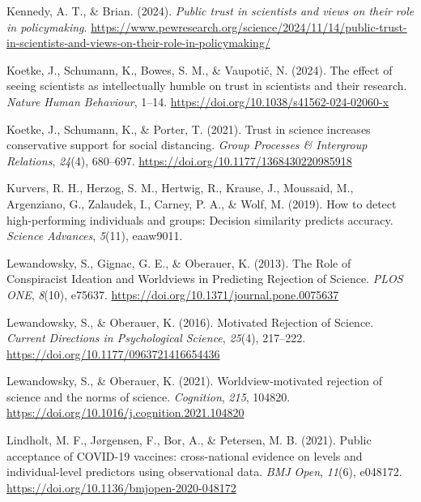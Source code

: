 \documentclass[
  jou,
  floatsintext,
  longtable,
  nolmodern,
  notxfonts,
  notimes,
  colorlinks=true,linkcolor=blue,citecolor=blue,urlcolor=blue]{apa7}
\newlength{\cslhangindent}
\newenvironment{CSLReferences}[2] %
 {\begin{list}{}{%
  \setlength{\itemindent}{0pt}
  \setlength{\leftmargin}{0pt}
  \setlength{\parsep}{0pt}
  \ifodd #1
   \setlength{\leftmargin}{\cslhangindent}
   \setlength{\itemindent}{-1\cslhangindent}
  \fi
  \setlength{\itemsep}{#2\baselineskip}}}
 {\end{list}}
\begin{document}
\begin{CSLReferences}{1}{0}
Kennedy, A. T., \& Brian. (2024). \emph{Public trust in scientists and
views on their role in policymaking}.
\url{https://www.pewresearch.org/science/2024/11/14/public-trust-in-scientists-and-views-on-their-role-in-policymaking/}

Koetke, J., Schumann, K., Bowes, S. M., \& Vaupotič, N. (2024). The
effect of seeing scientists as intellectually humble on trust in
scientists and their research. \emph{Nature Human Behaviour}, 1--14.
\url{https://doi.org/10.1038/s41562-024-02060-x}

Koetke, J., Schumann, K., \& Porter, T. (2021). Trust in science
increases conservative support for social distancing. \emph{Group
Processes \& Intergroup Relations}, \emph{24}(4), 680--697.
\url{https://doi.org/10.1177/1368430220985918}

Kurvers, R. H., Herzog, S. M., Hertwig, R., Krause, J., Moussaid, M.,
Argenziano, G., Zalaudek, I., Carney, P. A., \& Wolf, M. (2019). How to
detect high-performing individuals and groups: Decision similarity
predicts accuracy. \emph{Science Advances}, \emph{5}(11), eaaw9011.

Lewandowsky, S., Gignac, G. E., \& Oberauer, K. (2013). The Role of
Conspiracist Ideation and Worldviews in Predicting Rejection of Science.
\emph{PLOS ONE}, \emph{8}(10), e75637.
\url{https://doi.org/10.1371/journal.pone.0075637}

Lewandowsky, S., \& Oberauer, K. (2016). Motivated Rejection of Science.
\emph{Current Directions in Psychological Science}, \emph{25}(4),
217--222. \url{https://doi.org/10.1177/0963721416654436}

Lewandowsky, S., \& Oberauer, K. (2021). Worldview-motivated rejection
of science and the norms of science. \emph{Cognition}, \emph{215},
104820. \url{https://doi.org/10.1016/j.cognition.2021.104820}

Lindholt, M. F., Jørgensen, F., Bor, A., \& Petersen, M. B. (2021).
Public acceptance of COVID-19 vaccines: cross-national evidence on
levels and individual-level predictors using observational data.
\emph{BMJ Open}, \emph{11}(6), e048172.
\url{https://doi.org/10.1136/bmjopen-2020-048172}


\end{CSLReferences}
\end{document}

